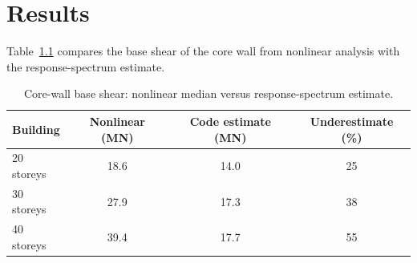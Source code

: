 \chapter{Results}
\label{ch:results}

Table~\ref{tab:shear} compares the base shear of the core wall from nonlinear analysis with the
response-spectrum estimate.

\begin{table}[htbp]
  \centering
  \caption{Core-wall base shear: nonlinear median versus response-spectrum estimate.}
  \label{tab:shear}
  \begin{tabular}{lccc}
    \toprule
    Building & Nonlinear (MN) & Code estimate (MN) & Underestimate (\%) \\
    \midrule
    20 storeys & 18.6 & 14.0 & 25 \\
    30 storeys & 27.9 & 17.3 & 38 \\
    40 storeys & 39.4 & 17.7 & 55 \\
    \bottomrule
  \end{tabular}
\end{table}
